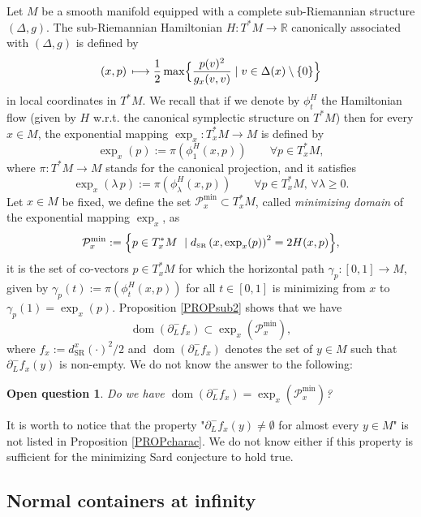 \documentclass[JEP,XML,SOM,Unicode,NoFloatCountersInSection,published]{cedram}
\newcommand\mto{\mathchoice{\longmapsto}{\mapsto}{\mapsto}{\mapsto}}
\let\sep\mid
\newcommand{\SR}{{\scriptscriptstyle\mathrm{SR}}}
\DeclareMathOperator{\dom}{dom}
\newcommand\R{\mathbb R}
\newtheorem*{OQ*}{Open question}
\theoremstyle{definition}
\begin{document}
Let $M$ be a smooth manifold equipped with a complete sub-Riemannian structure $(\Delta,g)$. The sub-Riemannian Hamiltonian $H:T^*M \to \R$ canonically associated with $(\Delta,g)$ is defined by
\[
(x,p) \, \mto \frac{1}{2} \max \Bigl\{ \frac{p(v)^2}{g_x(v,v)} \sep  v \in \Delta(x) \setminus \{0\} \Bigr\}
\]
in local coordinates in $T^*M$. We recall that if we denote by $\phi^H_t$ the Hamiltonian flow (given by $H$ w.r.t. the canonical symplectic
structure on $T^*M$) then for every $x\in M$, the exponential mapping $\exp_x:T_x^*M \to M$ is defined by
\[
\exp_x(p) := \pi \left(\phi^H_1(x,p)\right) \qquad \forall p \in T_x^*M,
\]
where $\pi:T^*M \to M$ stands for the canonical projection, and it satisfies
\[
\exp_x(\lambda \, p) := \pi \left(\phi^H_{\lambda}(x,p)\right) \qquad \forall p \in T_x^*M, \, \forall \lambda \geq 0.
\]
Let $x\in M$ be fixed, we define the set $\mathcal{P}_x^{\min}\subset T_x^*M$, called {\it minimizing domain} of the exponential mapping $\exp_x$, as
\[
\mathcal{P}_x^{\min} := \Bigl\{ p \in T^*_xM \sep  d_{\SR}\left(x, \exp_x(p)\right)^2 = 2H(x,p) \Bigr\},
\]
it is the set of co-vectors $p\in T_x^*M$ for which the horizontal path $\gamma_p:[0,1] \to M$, given by $\gamma_p(t):=\pi(\phi_t^H(x,p))$ for all $t\in [0,1]$ is minimizing from $x$ to $\gamma_p(1)=\exp_x(p)$. Proposition \ref{PROPsub2} shows that we have
\begin{equation}\label{8janexp}
\dom \left(\partial^-_L f_x\right) \subset \exp_x(\mathcal{P}_x^{\min}),
\end{equation}
where $f_x:=d_{\SR}^x(\cdot)^2/2$ and $\dom (\partial^-_L f_x)$ denotes the set of $y\in M$ such that $\partial^-_L f_x(y)$ is non-empty. We do not know the answer to the following:

\begin{OQ*}
Do we have $\dom \left(\partial^-_L f_x\right) = \exp_x \left(\mathcal{P}_x^{\min}\right)$?
\end{OQ*}

It is worth to notice that the property "$\partial^-_Lf_x(y)\neq \emptyset$ for almost every $y\in M$" is not listed in Proposition \ref{PROPcharac}. We do not know either if this property is sufficient for the minimizing Sard conjecture to hold true.

\subsection{Normal containers at infinity}
\end{document}
